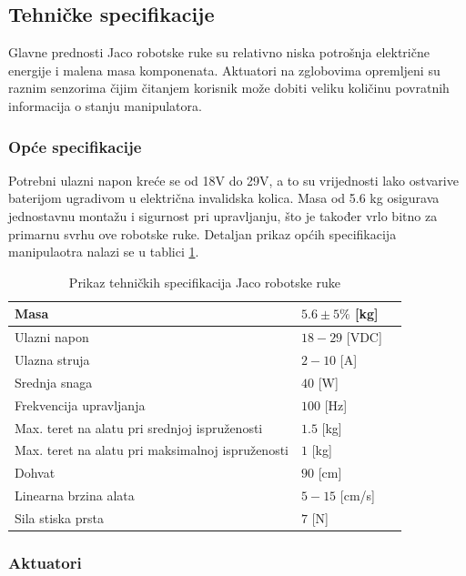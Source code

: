 \documentclass[times, utf8, diplomski, numeric]{fer}
\begin{document}
\subsection{Tehničke specifikacije}
Glavne prednosti Jaco robotske ruke su relativno niska potrošnja električne energije i malena masa komponenata.
Aktuatori na zglobovima opremljeni su raznim senzorima čijim čitanjem korisnik može dobiti veliku količinu povratnih informacija o stanju manipulatora.


\subsubsection{Opće specifikacije}
Potrebni ulazni napon kreće se od 18V do 29V,  a to su vrijednosti lako ostvarive baterijom ugradivom u električna invalidska kolica.
Masa od 5.6 kg osigurava jednostavnu montažu i sigurnost pri upravljanju, što je također vrlo bitno za primarnu svrhu ove robotske ruke.
Detaljan prikaz općih specifikacija manipulaotra nalazi se u tablici \ref{jaco_spec}.

\begin{table}[h!]
    \centering
    \caption{Prikaz tehničkih specifikacija Jaco robotske ruke} \label{jaco_spec}
    \begin{tabular}{ | l | l | l |}
    \hline
    Masa & $5.6 \pm 5\%$ [kg] \\ \hline
    Ulazni napon  & $18 - 29$ [VDC] \\ \hline
    Ulazna struja & $2 - 10$ [A] \\ \hline
    Srednja snaga & $40$ [W] \\ \hline
    Frekvencija upravljanja & $100$ [Hz] \\ \hline
    Max. teret na alatu pri srednjoj ispruženosti & $1.5$  [kg]  \\ \hline
    Max. teret na alatu pri maksimalnoj ispruženosti  & $1$ [kg]\\ \hline
    Dohvat & $90$  [cm] \\ \hline
    Linearna brzina alata & $5 - 15$ [cm/s]\\ \hline
    Sila stiska prsta & $7$ [N] \\ \hline
    \end{tabular}
\end{table}

\subsubsection{Aktuatori}
\end{document}
